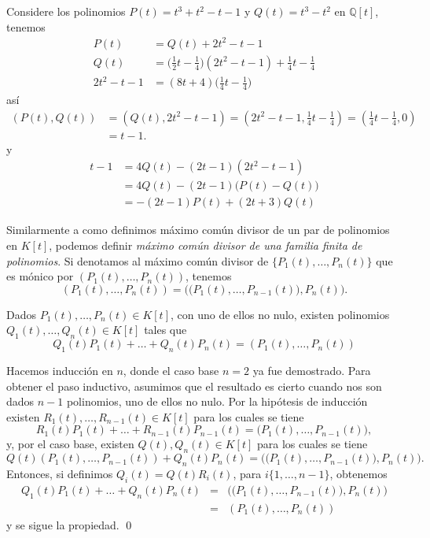 \begin{ejem}
Considere los polinomios $P(t)=t^3+t^2-t-1$ y $Q(t)=t^3-t^2$  en $\mathbb{Q}[t]$, tenemos
\begin{align*}
P(t) & = Q(t) + 2t^2-t-1\\
Q(t) & =\Big(\frac{1}{2}t-\frac{1}{4}\Big)(2t^2-t-1)+\frac{1}{4}t-\frac{1}{4}\\
2t^2-t-1 & = (8t+4)\Big(\frac{1}{4}t-\frac{1}{4}\Big)
\end{align*}
as\'i
\begin{align*}
(P(t),Q(t)) & = (Q(t),2t^2-t-1) = (2t^2-t-1,\frac{1}{4}t-\frac{1}{4}) = (\frac{1}{4}t-\frac{1}{4},0)\\
 & = t-1. 
\end{align*}
y
\begin{align*}
t-1 & = 4Q(t)-(2t-1)(2t^2-t-1)\\
  & = 4Q(t)-(2t-1)\big(P(t)-Q(t)\big)\\
  & = -(2t-1)P(t)+(2t+3)Q(t)
\end{align*}
\end{ejem}

\begin{obs}
Similarmente a como definimos m\'aximo com\'un divisor de un par de polinomios en $K[t]$, podemos definir  \emph{m\'aximo com\'un divisor de una familia finita de polinomios}. Si denotamos al m\'aximo com\'un divisor de $\{P_1(t),\ldots,P_n(t)\}$ que es m\'onico por $\left(P_1(t),\ldots,P_n(t)\right)$, tenemos
\[
\left(P_1(t),\ldots,P_n(t)\right)=\Big(\big(P_1(t),\ldots,P_{n-1}(t)\big), P_n(t)\Big).
\]
\end{obs}

\begin{pro}
Dados $P_1(t),\ldots,P_n(t)\in K[t]$, con uno de ellos no nulo, existen polinomios $Q_1(t),\ldots,Q_n(t)\in K[t]$ tales que
\[
Q_1(t)P_1(t)+\ldots+Q_n(t)P_n(t)=\left(P_1(t),\ldots,P_n(t)\right)
\]
\end{pro}

\dem Hacemos inducci\'on en $n$, donde el caso base $n=2$ ya fue demostrado. Para obtener el paso inductivo, asumimos que el resultado es cierto cuando nos son dados $n-1$ polinomios, uno de ellos no nulo. Por la hip\'otesis de inducci\'on existen $R_1(t),\ldots,R_{n-1}(t)\in K[t]$ para los cuales se tiene
\[
R_1(t)P_1(t)+\ldots+R_{n-1}(t)P_{n-1}(t)=\big(P_1(t),\ldots,P_{n-1}(t)\big),
\]
y, por el caso base, existen $Q(t),Q_n(t)\in K[t]$ para los cuales se tiene
\[
Q(t)\left(P_1(t),\ldots,P_{n-1}(t)\right)+Q_n(t)P_n(t)=\Big(\big(P_1(t),\ldots,P_{n-1}(t)\big), P_n(t)\Big).
\]
Entonces, si definimos $Q_i(t)=Q(t)R_i(t)$, para $i\{1,\ldots,n-1\}$, obtenemos
\begin{eqnarray*}
Q_1(t)P_1(t)+\ldots+Q_n(t)P_n(t) & = & \Big(\big(P_1(t),\ldots,P_{n-1}(t)\big), P_n(t)\Big)\\
 & = & \left(P_1(t),\ldots,P_n(t)\right)
\end{eqnarray*}
y se sigue la propiedad.
\qed

